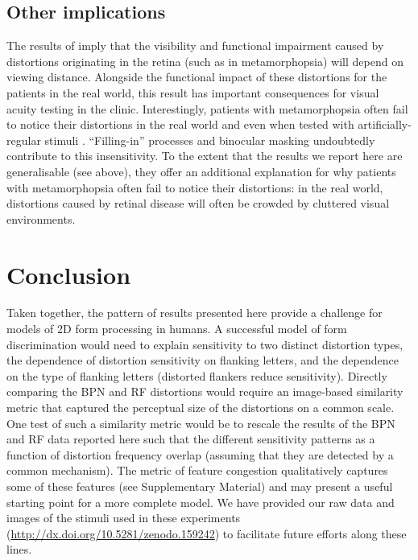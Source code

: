 \documentclass[doc, 11pt,a4paper,natbib]{apa6}\usepackage[]{graphicx}\usepackage[]{color}
\begin{document}
\subsection{Other implications}
The results of \citet{wiecek_metamorphopsia_2014} imply that the visibility and functional impairment caused by distortions originating in the retina (such as in metamorphopsia) will depend on viewing distance.
Alongside the functional impact of these distortions for the patients in the real world, this result has important consequences for visual acuity testing in the clinic.
Interestingly, patients with metamorphopsia often fail to notice their distortions in the real world \citep{wiecek_metamorphopsia_2015} and even when tested with artificially-regular stimuli \citep{crossland_amsler_2007,schuchard_validity_1993,wiecek_metamorphopsia_2015}.
``Filling-in'' processes \citep{crossland_amsler_2007} and binocular masking \citep{wiecek_metamorphopsia_2015} undoubtedly contribute to this insensitivity.
To the extent that the results we report here are generalisable (see above), they \citep[along with][]{bex_sensitivity_2010} offer an additional explanation for why patients with metamorphopsia often fail to notice their distortions: in the real world, distortions caused by retinal disease will often be crowded by cluttered visual environments.


\section{Conclusion}

Taken together, the pattern of results presented here provide a challenge for models of 2D form processing in humans.
A successful model of form discrimination would need to explain sensitivity to two distinct distortion types, the dependence of distortion sensitivity on flanking letters, and the dependence on the type of flanking letters (distorted flankers reduce sensitivity).
Directly comparing the BPN and RF distortions would require an image-based similarity metric that captured the perceptual size of the distortions on a common scale.
One test of such a similarity metric would be to rescale the results of the BPN and RF data reported here such that the different sensitivity patterns as a function of distortion frequency overlap (assuming that they are detected by a common mechanism).
The metric of feature congestion \citep{rosenholtz_measuring_2007} qualitatively captures some of these features (see Supplementary Material) and may present a useful starting point for a more complete model.
We have provided our raw data and images of the stimuli used in these experiments (\url{http://dx.doi.org/10.5281/zenodo.159242}) to facilitate future efforts along these lines.
\end{document}
